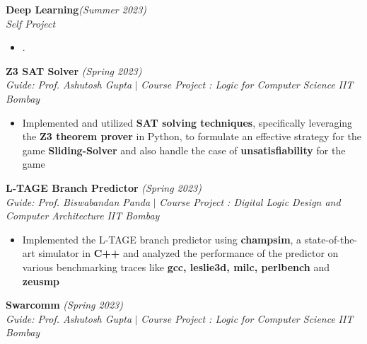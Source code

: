 \documentclass[a4paper,10pt]{article}
\begin{document}
\vspace{\baselineskip}
\vspace{-22pt}
\noindent\textbf{\large Deep Learning}\hfill{\sl \small (Summer 2023)}\\
{\it Self Project}
\\\vspace{-15pt}
\begin{itemize}[itemsep = -0.65 mm, leftmargin=*]
    \item .
\end{itemize}
\vspace{-7pt}
\vspace{\baselineskip}
\vspace{-15pt}
\noindent\textbf{\large Z3 SAT Solver} \hfill{\sl \small (Spring 2023)}\\
{\it Guide: Prof. Ashutosh Gupta} $|$ {\it Course Project : Logic for Computer Science } \hfill{\it IIT Bombay}
\vspace{-2pt}
\begin{itemize}[itemsep = -0.65 mm, leftmargin=*]
    \item Implemented and utilized \textbf{SAT solving techniques}, specifically leveraging the \textbf{Z3 theorem prover} in Python, to formulate an effective strategy for the game \textbf{Sliding-Solver} and also handle the case of \textbf{unsatisfiability} for the game
\end{itemize}
\vspace{\baselineskip}
\vspace{-15pt}
\noindent\textbf{\large L-TAGE Branch Predictor} \hfill{\sl \small (Spring 2023)}\\
{\it Guide: Prof. Biswabandan Panda} $|$ {\it Course Project : Digital Logic Design and Computer Architecture } \hfill{\it IIT Bombay}
\vspace{-2pt}
\begin{itemize}[itemsep = -0.65 mm, leftmargin=*]
    \item Implemented the L-TAGE branch predictor using \textbf{champsim}, a state-of-the-art simulator in \textbf{C++} and analyzed the performance of the predictor on various benchmarking traces like \textbf{gcc, leslie3d, milc, perlbench} and \textbf{zeusmp}
\end{itemize}
\vspace{\baselineskip}
\vspace{-15pt}
\noindent\textbf{\large Swarcomm} \hfill{\sl \small (Spring 2023)}\\
{\it Guide: Prof. Ashutosh Gupta} $|$ {\it Course Project : Logic for Computer Science } \hfill{\it IIT Bombay}
\end{document}
